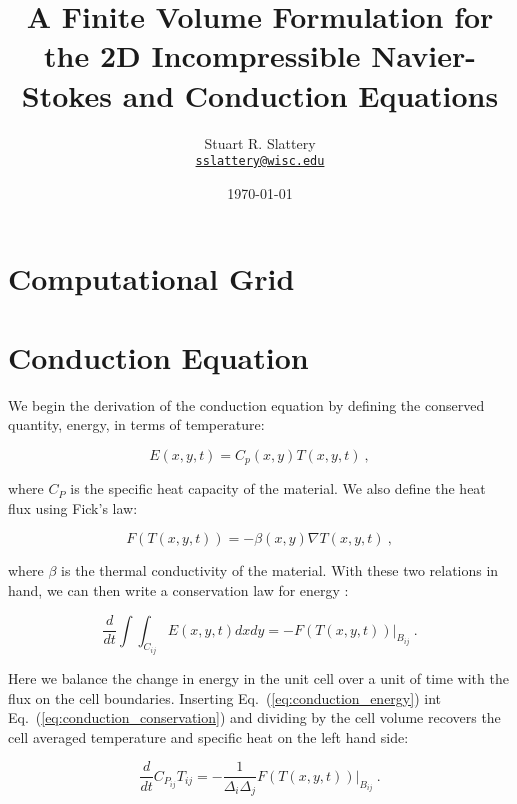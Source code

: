 \documentclass[letterpaper,12pt]{article}
\author{Stuart R. Slattery
\\ \href{mailto:sslattery@wisc.edu}{\texttt{sslattery@wisc.edu}}
}
\date{\today}
\title{A Finite Volume Formulation for the 2D Incompressible
  Navier-Stokes and Conduction Equations}
\begin{document}
\maketitle

\section{Computational Grid}

\section{Conduction Equation}
We begin the derivation of the conduction equation by defining the
conserved quantity, energy, in terms of temperature:

\begin{equation}
  E(x,y,t) = C_p(x,y) T(x,y,t)\:,
  \label{eq:conduction_energy}
\end{equation}

where $C_P$ is the specific heat capacity of the material. We also
define the heat flux using Fick's law:

\begin{equation}
  F(T(x,y,t)) = -\beta(x,y) \nabla T(x,y,t)\:,
  \label{eq:conduction_ficks_law}
\end{equation}

where $\beta$ is the thermal conductivity of the material. With these
two relations in hand, we can then write a conservation law for energy
\cite{leveque_2002}:

\begin{equation}
  \frac{d}{dt} \int \int_{C_{ij}} E(x,y,t) dx dy = -F(T(x,y,t)) |_{B_{ij}}\:.
  \label{eq:conduction_conservation}
\end{equation}

Here we balance the change in energy in the unit cell over a unit of
time with the flux on the cell boundaries. Inserting
Eq.~(\ref{eq:conduction_energy}) int
Eq.~(\ref{eq:conduction_conservation}) and dividing by the cell volume
recovers the cell averaged temperature and specific heat on the left
hand side:

\begin{equation}
  \frac{d}{dt} C_{P_{ij}} T_{ij} = -\frac{1}{\Delta_i
    \Delta_j}F(T(x,y,t)) |_{B_{ij}}\:.
  \label{eq:conduction_cell_averaged}
\end{equation}
\end{document}

